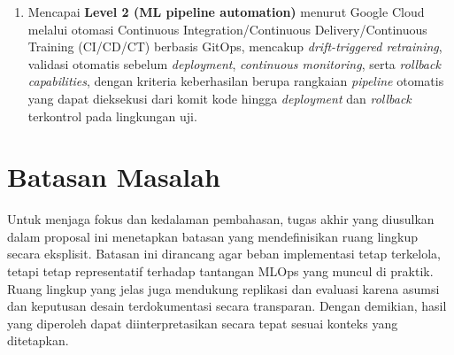 \begin{enumerate}
    \vspace{0.5em}

    \item Mencapai \textbf{Level 2 (ML pipeline automation)} menurut Google Cloud \autocite{googlecloud2024mlops} melalui otomasi Continuous Integration/Continuous Delivery/Continuous Training (CI/CD/CT) berbasis GitOps, mencakup \textit{drift-triggered retraining}, validasi otomatis sebelum \textit{deployment}, \textit{continuous monitoring}, serta \textit{rollback capabilities}, dengan kriteria keberhasilan berupa rangkaian \textit{pipeline} otomatis yang dapat dieksekusi dari komit kode hingga \textit{deployment} dan \textit{rollback} terkontrol pada lingkungan uji.
\end{enumerate}

\section{Batasan Masalah}

Untuk menjaga fokus dan kedalaman pembahasan, tugas akhir yang diusulkan dalam proposal ini menetapkan batasan yang mendefinisikan ruang lingkup secara eksplisit. Batasan ini dirancang agar beban implementasi tetap terkelola, tetapi tetap representatif terhadap tantangan MLOps yang muncul di praktik. Ruang lingkup yang jelas juga mendukung replikasi dan evaluasi karena asumsi dan keputusan desain terdokumentasi secara transparan. Dengan demikian, hasil yang diperoleh dapat diinterpretasikan secara tepat sesuai konteks yang ditetapkan.

